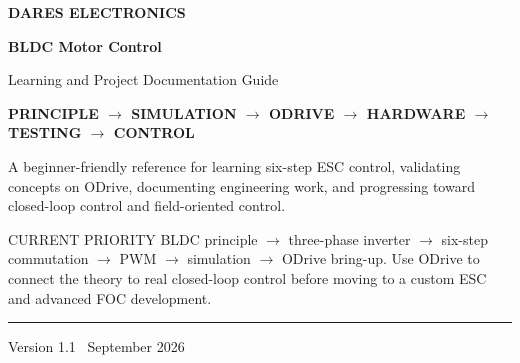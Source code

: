 \documentclass[11pt,a4paper]{article}
\begin{document}
\hypersetup{pageanchor=false}

\begin{titlepage}
  \thispagestyle{empty}
  \pagecolor{DARESPaper}
  \color{DARESNavy}

  \vspace*{20mm}
  {\large\bfseries\color{DARESTeal}DARES ELECTRONICS\par}
  \vspace{12mm}

  {\fontsize{30}{34}\selectfont\bfseries BLDC Motor Control\par}
  \vspace{3mm}
  {\Large\color{DARESMuted}Learning and Project Documentation Guide\par}

  \vspace{15mm}
  \begin{tcolorbox}[
    colback=DARESNavy,
    colframe=DARESNavy,
    arc=0pt,
    boxrule=0pt,
    left=4mm,right=4mm,top=4mm,bottom=4mm]
    \centering\bfseries\color{white}
    PRINCIPLE \(\rightarrow\) SIMULATION \(\rightarrow\) ODRIVE
    \(\rightarrow\) HARDWARE \(\rightarrow\) TESTING \(\rightarrow\) CONTROL
  \end{tcolorbox}

  \vspace{15mm}
  {\large\color{DARESMuted}
    A beginner-friendly reference for learning six-step ESC control,
    validating concepts on ODrive, documenting engineering work, and
    progressing toward closed-loop control and field-oriented control.
    \par}

  \vfill
  \begin{callout}{CURRENT PRIORITY}
    BLDC principle \(\rightarrow\) three-phase inverter \(\rightarrow\)
    six-step commutation \(\rightarrow\) PWM \(\rightarrow\) simulation
    \(\rightarrow\) ODrive bring-up. Use ODrive to connect the theory to
    real closed-loop control before moving to a custom ESC and advanced
    FOC development.
  \end{callout}

  \vfill
  {\color{DARESCoral}\rule{32mm}{2pt}\par}
  \vspace{3mm}
  {\small\color{DARESMuted}Version 1.1 \textbar\ September 2026\par}
\end{titlepage}
\nopagecolor
\hypersetup{pageanchor=true}

\tableofcontents
\clearpage
\end{document}
